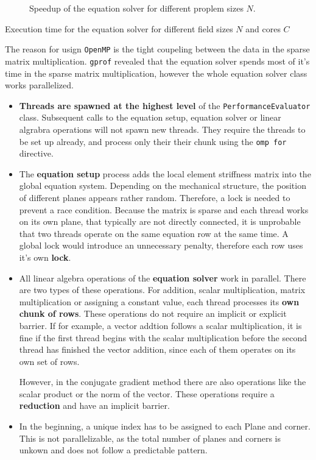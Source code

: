 \documentclass[12pt]{article}
\begin{document}
\begin{figure}[p]
    \centering
    
    \caption{Speedup of the equation solver for different proplem sizes $N$.}
    \label{fig:SpeedupSimulation}
\end{figure}

\begin{table}[p]
    \centering
    
    \caption{Execution time for the equation solver for different field sizes $N$ and cores $C$}
    \label{tab:SpeedupSimulation}
\end{table}

The reason for usign \texttt{OpenMP} is the tight coupeling between the data in the sparse matrix multiplication. \texttt{gprof} revealed that the equation solver spends most of it's time in the sparse matrix multiplication, however the whole equation solver class works parallelized.

\begin{itemize}
    \item \textbf{Threads are spawned at the highest level} of the \texttt{PerformanceEvaluator} class. Subsequent calls to the equation setup, equation solver or linear algrabra operations will not spawn new threads. They require the threads to be set up already, and process only their their chunk using the \texttt{omp for} directive.
    \item The \textbf{equation setup} process adds the local element striffness matrix into the global equation system. Depending on the mechanical structure, the position of different planes appears rather random. Therefore, a lock is needed to prevent a race condition. Because the matrix is sparse and each thread works on its own plane, that typically are not directly connected, it is unprobable that two threads operate on the same equation row at the same time. A global lock would introduce an unnecessary penalty, therefore each row uses it's own \textbf{lock}.
    \item All linear algebra operations of the \textbf{equation solver} work in parallel. There are two types of these operations. For addition, scalar multiplication, matrix multiplication or assigning a constant value, each thread processes its \textbf{own chunk of rows}. These operations do not require an implicit or explicit barrier. If for example, a vector addtion follows a scalar multiplication, it is fine if the first thread begins with the scalar multiplication before the second thread has finished the vector addition, since each of them operates on its own set of rows.
    
    However, in the conjugate gradient method there are also operations like the scalar product or the norm of the vector. These operations require a \textbf{reduction} and have an implicit barrier.
    \item In the beginning, a unique index has to be assigned to each Plane and corner. This is not parallelizable, as the total number of planes and corners is unkown and does not follow a predictable pattern.
\end{itemize}
\end{document}
